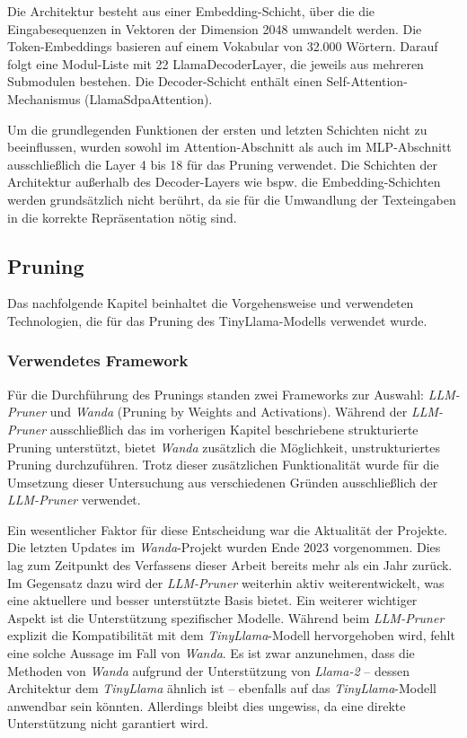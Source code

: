 Die Architektur besteht aus einer Embedding-Schicht, über die die
Eingabesequenzen in Vektoren der Dimension 2048 umwandelt werden. Die
Token-Embeddings basieren auf einem Vokabular von 32.000 Wörtern. Darauf folgt
eine Modul-Liste mit 22 LlamaDecoderLayer, die jeweils aus mehreren Submodulen
bestehen. Die Decoder-Schicht enthält einen Self-Attention-Mechanismus
(LlamaSdpaAttention).

Um die grundlegenden Funktionen der ersten und letzten Schichten nicht zu
beeinflussen, wurden sowohl im Attention-Abschnitt als auch im MLP-Abschnitt
ausschließlich die Layer 4 bis 18 für das Pruning verwendet. Die Schichten der
Architektur außerhalb des Decoder-Layers wie bspw. die Embedding-Schichten
werden grundsätzlich nicht berührt, da sie für die Umwandlung der Texteingaben
in die korrekte Repräsentation nötig sind.

\subsection{Pruning}

Das nachfolgende Kapitel beinhaltet die Vorgehensweise und verwendeten
Technologien, die für das Pruning des TinyLlama-Modells verwendet wurde.

\subsubsection{Verwendetes Framework}

Für die Durchführung des Prunings standen zwei Frameworks zur Auswahl:
\emph{LLM-Pruner} und \emph{Wanda} (Pruning by Weights and Activations). Während
der \emph{LLM-Pruner} ausschließlich das im vorherigen Kapitel beschriebene
strukturierte Pruning unterstützt, bietet \emph{Wanda} zusätzlich die
Möglichkeit, unstrukturiertes Pruning durchzuführen. Trotz dieser zusätzlichen
Funktionalität wurde für die Umsetzung dieser Untersuchung aus verschiedenen
Gründen ausschließlich der \emph{LLM-Pruner} verwendet.

Ein wesentlicher Faktor für diese Entscheidung war die Aktualität der Projekte.
Die letzten Updates im \emph{Wanda}-Projekt wurden Ende 2023 vorgenommen. Dies
lag zum Zeitpunkt des Verfassens dieser Arbeit bereits mehr als ein Jahr zurück.
Im Gegensatz dazu wird der \emph{LLM-Pruner} weiterhin aktiv weiterentwickelt,
was eine aktuellere und besser unterstützte Basis bietet. Ein weiterer wichtiger
Aspekt ist die Unterstützung spezifischer Modelle. Während beim
\emph{LLM-Pruner} explizit die Kompatibilität mit dem \emph{TinyLlama}-Modell
hervorgehoben wird, fehlt eine solche Aussage im Fall von \emph{Wanda}. Es ist
zwar anzunehmen, dass die Methoden von \emph{Wanda} aufgrund der Unterstützung
von \emph{Llama-2} – dessen Architektur dem \emph{TinyLlama} ähnlich ist –
ebenfalls auf das \emph{TinyLlama}-Modell anwendbar sein könnten. Allerdings
bleibt dies ungewiss, da eine direkte Unterstützung nicht garantiert wird.

